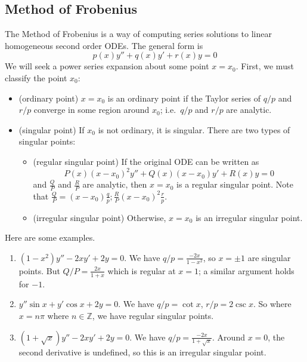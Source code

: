 \subsection{Method of Frobenius}
The Method of Frobenius is a way of computing series solutions to linear homogeneous second order ODEs.
The general form is
\[
	p(x)y'' + q(x)y' + r(x)y = 0
\]
We will seek a power series expansion about some point \(x = x_0\).
First, we must classify the point \(x_0\):
\begin{itemize}
	\item (ordinary point) \(x=x_0\) is an ordinary point if the Taylor series of \(q/p\) and \(r/p\) converge in some region around \(x_0\); i.e.\ \(q/p\) and \(r/p\) are analytic.
	\item (singular point) If \(x_0\) is not ordinary, it is singular.
	      There are two types of singular points:
	      \begin{itemize}
		      \item (regular singular point) If the original ODE can be written as
		            \[
			            P(x)(x-x_0)^2 y'' + Q(x)(x-x_0)y' + R(x)y = 0
		            \]
		            and \(\frac{Q}{P}\) and \(\frac{R}{P}\) are analytic, then \(x=x_0\) is a regular singular point.
		            Note that \(\frac{Q}{P} = (x-x_0)\frac{q}{p}; \frac{R}{P}(x-x_0)^2\frac{r}{p}\).
		      \item (irregular singular point) Otherwise, \(x=x_0\) is an irregular singular point.
	      \end{itemize}
\end{itemize}
Here are some examples.
\begin{enumerate}
	\item \((1-x^2)y'' - 2xy' + 2y = 0\).
	      We have \(q/p = \frac{-2x}{1-x^2}\), so \(x = \pm 1\) are singular points.
	      But \(Q/P = \frac{2x}{1+x}\) which is regular at \(x=1\); a similar argument holds for \(-1\).
	\item \(y''\sin x + y'\cos x + 2y = 0\).
	      We have \(q/p = \cot x\), \(r/p = 2\csc x\).
	      So where \(x = n\pi\) where \(n \in \mathbb Z\), we have regular singular points.
	\item \((1+\sqrt{x})y'' - 2xy' + 2y = 0\).
	      We have \(q/p = \frac{-2x}{1+\sqrt{x}}\).
	      Around \(x=0\), the second derivative is undefined, so this is an irregular singular point.
\end{enumerate}

